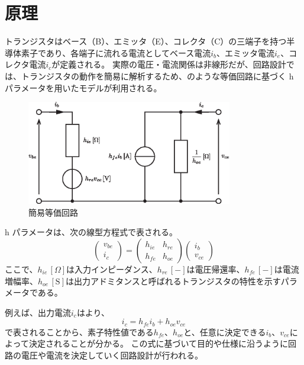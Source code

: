 \documentclass[11pt,dvipdfmx]{jarticle}
\begin{document}
\section{原理}
トランジスタはベース（B）、エミッタ（E）、コレクタ（C）の三端子を持つ半導体素子であり、各端子に流れる電流としてベース電流$i_b$、エミッタ電流$i_e$、コレクタ電流$i_c$が定義される。
実際の電圧・電流関係は非線形だが、回路設計では、トランジスタの動作を簡易に解析するため、のような等価回路に基づく h パラメータを用いたモデルが利用される。
\begin{figure}[htb]
	\centering
	\includegraphics[width=90mm]{fig/eqc.eps}
	\caption{簡易等価回路}
	\label{fig:eqc}
\end{figure}
h パラメータは、次の線型方程式で表される。
\begin{equation}
	\begin{pmatrix}
		v_{be} \\
		i_c
	\end{pmatrix}
	=
	\begin{pmatrix}
		h_{ie} & h_{re} \\
		h_{fe} & h_{oe}
	\end{pmatrix}
	\begin{pmatrix}
		i_b \\
		v_{ce}
	\end{pmatrix}
	\label{eq:h_para}
\end{equation}
ここで、$h_{ie}\,[\Omega]$は入力インピーダンス、$h_{re}\,[-]$は電圧帰還率、$h_{fe}\,[-]$は電流増幅率、$h_{oe}\,[\mathrm{S}]$は出力アドミタンスと呼ばれるトランジスタの特性を示すパラメータである。

例えば、出力電流$i_c$はより、
\begin{equation}
	i_c = h_{fe}i_b + h_{oe}v_{ce}
	\label{eq:vce}
\end{equation}
で表されることから、素子特性値である$h_{fe}$、$h_{oe}$と、任意に決定できる$i_b$、$v_{ce}$によって決定されることが分かる。
この式に基づいて目的や仕様に沿うように回路の電圧や電流を決定していく回路設計が行われる。
\end{document}
